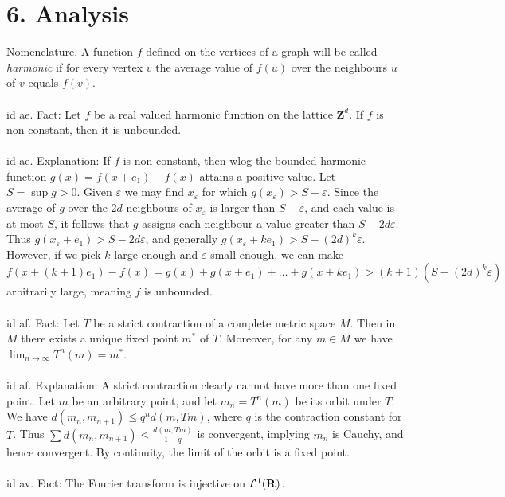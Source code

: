 \documentclass[oneside]{book}
\newcommand{\eps}{\varepsilon}
\newcommand{\Z}{\mathbf{Z}}
\newcommand{\R}{\mathbf{R}}
\newcommand\chap[1]{%
  \chapter*{#1}%
  \addcontentsline{toc}{chapter}{#1}}
\begin{document}
\newpage
\chap{6. Analysis}
Nomenclature. A function $f$ defined on the vertices of a graph will be called {\it{harmonic}} if for every vertex $v$ the average value of $f(u)$ over the neighbours $u$ of $v$ equals $f(v)$.  \\\\


id ae. Fact: Let $f$ be a real valued harmonic function on the lattice $\Z^d$. If $f$ is non-constant, then it is unbounded. \\\\


id ae. Explanation: If $f$ is non-constant, then wlog the bounded harmonic function $g(x)=f(x+e_1)-f(x)$ attains a positive value. Let $S=\sup g > 0$. Given $\eps$ we may find $x_\eps$ for which $g(x_\eps)>S-\eps$. Since the average of $g$ over the $2d$ neighbours of $x_\eps$ is larger than $S-\eps$, and each value is at most $S$, it follows that $g$ assigns each neighbour a value greater than $S-2d\eps$. Thus $g(x_\eps + e_1) > S-2d\eps$, and generally $g(x_\eps + ke_1) > S-(2d)^k\eps$. However, if we pick $k$ large enough and $\eps$ small enough, we can make $f(x+(k+1)e_1)-f(x)=g(x)+g(x+e_1)+\dots+g(x+ke_1) > (k+1)(S-(2d)^k\eps)$ arbitrarily large, meaning $f$ is unbounded.    \\\\


id af. Fact: Let $T$ be a strict contraction of a complete metric space $M$. Then in $M$ there exists a unique fixed point $m^*$ of $T$. Moreover, for any $m\in M$ we have $\displaystyle\lim_{n\to\infty} T^{ n}(m)=m^*$. \\\\


id af. Explanation: A strict contraction clearly cannot have more than one fixed point. Let $m$ be an arbitrary point, and let $m_n=T^n(m)$ be its orbit under $T$. We have $d(m_n,m_{n+1})\le q^{n}d(m,Tm)$, where $q$ is the contraction constant for $T$. Thus $\sum d(m_n,m_{n+1}) \le \frac{d(m,Tm)}{1-q}$ is convergent, implying $m_n$ is Cauchy, and hence convergent. By continuity, the limit of the orbit is a fixed point.  \\\\


id av. Fact: The Fourier transform is injective on $\LL^1(\R)$.     \\\\
\end{document}
